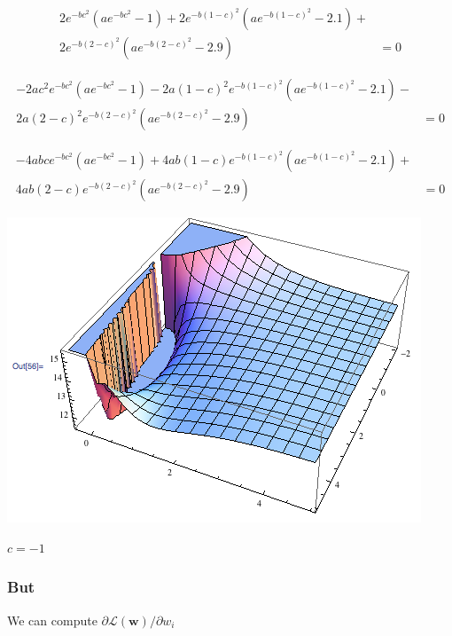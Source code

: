 \documentclass[USenglish,pdftex,compress,10pt,svgnamesi,handout]{beamer}
\def\Vec#1{\textbf{#1}}
\begin{document}
\begin{frame}
\begin{align*}
2 e^{-b c^2} \left(a e^{-b c^2}-1\right)+2 e^{-b (1-c)^2} \left(a e^{-b (1-c)^2}-2.1\right)+&\\
2 e^{-b (2-c)^2}
   \left(a e^{-b (2-c)^2}-2.9\right)&=0
   \end{align*}
   
 \begin{align*}
-2 a c^2 e^{-b c^2} \left(a e^{-b c^2}-1\right)-2 a (1-c)^2 e^{-b (1-c)^2} \left(a e^{-b (1-c)^2}-2.1\right)-&\\
2   a (2-c)^2 e^{-b (2-c)^2} \left(a e^{-b (2-c)^2}-2.9\right)&=0
   \end{align*}
   
 \begin{align*}
-4 a b c e^{-b c^2} \left(a e^{-b c^2}-1\right)+4 a b (1-c) e^{-b (1-c)^2} \left(a e^{-b (1-c)^2}-2.1\right)+&\\
4
   a b (2-c) e^{-b (2-c)^2} \left(a e^{-b (2-c)^2}-2.9\right)&=0
   \end{align*}
\end{frame}
   \begin{frame}
\includegraphics[width=\textwidth]{weirdfunc}

$c = -1$
\end{frame}

   

\begin{frame}
\frametitle{But}
We can compute $\partial \mathcal L(\Vec w) / \partial w_i$
\end{frame}
\end{document}
